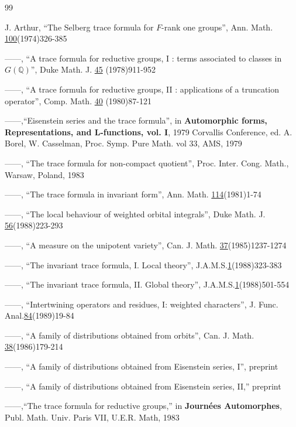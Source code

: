
\begin{thebibliography}{99}

 J. Arthur,
``The Selberg trace formula for $F$-rank one groups'', Ann.
Math. \underline{100}(1974)326-385

 ------,
``A trace formula for reductive groups, I : terms associated to
classes in $G(\mathbb{Q})$'', Duke Math. J. \underline{45} (1978)911-952

  ------,
``A trace formula for reductive groups, II : applications of a
truncation operator'', Comp. Math. \underline{40} (1980)87-121

 ------,``Eisenstein series and the trace formula'', in
{\bf Automorphic forms, Representations, and
L-functions, vol. I}, 1979 Corvallis Conference, ed. A. Borel, W. Casselman,
Proc. Symp. Pure Math. vol 33, AMS, 1979 

 ------,
``The trace formula for non-compact quotient'', Proc. Inter.
Cong. Math., Warsaw, Poland, 1983

 ------, ``The trace formula in invariant form'', Ann. Math.
\underline{114}(1981)1-74

 ------, ``The local behaviour of weighted orbital integrals'',
Duke Math. J. \underline{56}(1988)223-293

 ------, ``A measure on the unipotent variety'', Can. J. Math.
\underline{37}(1985)1237-1274

 ------, ``The invariant trace formula, I. Local theory'',
J.A.M.S.\underline{1}(1988)323-383

 ------, ``The invariant trace formula, II. Global theory'',
J.A.M.S.\underline{1}(1988)501-554

 ------, ``Intertwining operators and residues, I: weighted
characters'', J. Func. Anal.\underline{84}(1989)19-84

 ------, ``A family of distributions obtained from
orbits'', Can. J.
Math. \underline{38}(1986)179-214

 ------, ``A family of distributions obtained from
Eisenstein series, I'', preprint

 ------, ``A family of distributions obtained from
Eisenstein series, II,'' preprint

 ------,``The trace formula for reductive groups,'' in
{\bf Journ\'ees Automorphes}, Publ. Math. Univ. Paris VII,
U.E.R. Math, 1983


\end{thebibliography}
